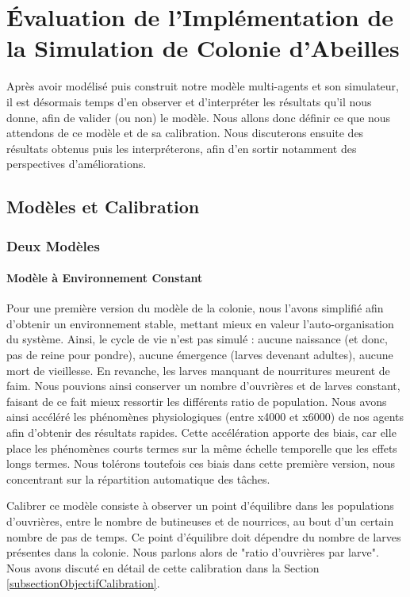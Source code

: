 \chapter{Évaluation de l'Implémentation de la Simulation de Colonie d'Abeilles}
\label{ChapitreEvalSMA}
	Après avoir modélisé puis construit notre modèle multi-agents et son simulateur, il est désormais temps d'en observer et d'interpréter les résultats qu'il nous donne, afin de valider (ou non) le modèle. Nous allons donc définir ce que nous attendons de ce modèle et de sa calibration. Nous discuterons ensuite des résultats obtenus puis les interpréterons, afin d'en sortir notamment des perspectives d'améliorations.
	
	
	\section{Modèles et Calibration}
		\subsection{Deux Modèles}
			\subsubsection{Modèle à Environnement Constant}
			Pour une première version du modèle de la colonie, nous l'avons simplifié afin d'obtenir un environnement stable, mettant mieux en valeur l'auto-organisation du système. Ainsi, le cycle de vie n'est pas simulé : aucune naissance (et donc, pas de reine pour pondre), aucune émergence (larves devenant adultes), aucune mort de vieillesse. En revanche, les larves manquant de nourritures meurent de faim. Nous pouvions ainsi conserver un nombre d'ouvrières et de larves constant, faisant de ce fait mieux ressortir les différents ratio de population. Nous avons ainsi accéléré les phénomènes physiologiques (entre x4000 et x6000) de nos agents afin d'obtenir des résultats rapides. Cette accélération apporte des biais, car elle place les phénomènes courts termes sur la même échelle temporelle que les effets longs termes. Nous tolérons toutefois ces biais dans cette première version, nous concentrant sur la répartition automatique des tâches. 
			
			Calibrer ce modèle consiste à observer un point d'équilibre dans les populations d'ouvrières, entre le nombre de butineuses et de nourrices, au bout d'un certain nombre de pas de temps. Ce point d'équilibre doit dépendre du nombre de larves présentes dans la colonie. Nous parlons alors de "ratio d'ouvrières par larve". Nous avons discuté en détail de cette calibration dans la Section \ref{subsectionObjectifCalibration}.
			
